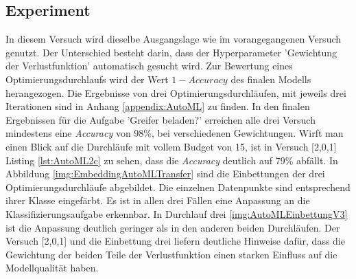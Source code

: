 	\subsection{Experiment}
	\label{subsec:AutoMLExperiment}
	In diesem Versuch wird dieselbe Ausgangslage wie im vorangegangenen Versuch genutzt. Der Unterschied besteht darin, dass der Hyperparameter 'Gewichtung der Verlustfunktion' automatisch gesucht wird. Zur Bewertung eines Optimierungsdurchlaufs wird der Wert $1 - Accuracy$ des finalen Modells herangezogen. Die Ergebnisse von drei Optimierungsdurchläufen, mit jeweils drei Iterationen sind in Anhang \ref{appendix:AutoML} zu finden. In den finalen Ergebnissen für die Aufgabe 'Greifer beladen?' erreichen alle drei Versuch mindestens eine \textit{Accuracy} von 98\%, bei verschiedenen Gewichtungen.  Wirft man einen Blick auf die Durchläufe mit vollem Budget von 15, ist in Versuch [2,0,1] Listing \ref{lst:AutoML2c} zu sehen, dass die \textit{Accuracy} deutlich auf 79\% abfällt. In Abbildung \ref{img:EmbeddingAutoMLTransfer} sind die Einbettungen der drei Optimierungsdurchläufe abgebildet. Die einzelnen Datenpunkte sind entsprechend ihrer Klasse eingefärbt. Es ist in allen drei Fällen eine Anpassung an die Klassifizierungsaufgabe erkennbar. In Durchlauf drei \ref{img:AutoMLEinbettungV3} ist die Anpassung deutlich geringer als in den anderen beiden Durchläufen. Der Versuch [2,0,1] und die Einbettung drei liefern deutliche Hinweise dafür, dass die Gewichtung der beiden Teile der Verlustfunktion einen starken Einfluss auf die Modellqualität haben. 
	
